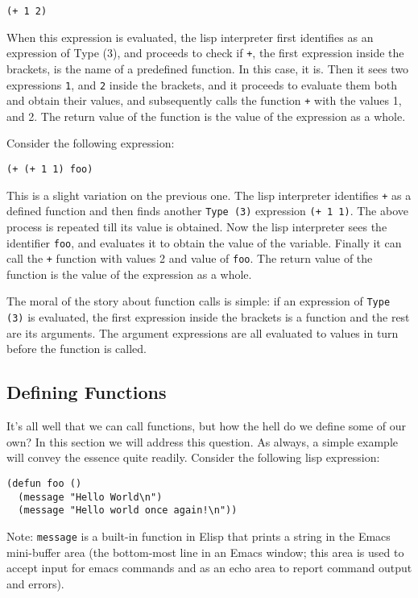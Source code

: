 \documentclass[10pt]{article}
\begin{document}
\texttt{(+ 1 2)}

When this expression is evaluated, the lisp interpreter first identifies as an
expression of Type (3), and proceeds to check if \texttt{+}, the first
expression inside the brackets, is the name of a predefined function.  In this
case, it is.  Then it sees two expressions \texttt{1}, and \texttt{2} inside
the brackets, and it proceeds to evaluate them both and obtain their values,
and subsequently calls the function \texttt{+} with the values 1, and 2.  The
return value of the function is the value of the expression as a whole.

Consider the following expression:

\texttt{(+ (+ 1 1) foo)}

This is a slight variation on the previous one.  The lisp interpreter
identifies \texttt{+} as a defined function and then finds another \texttt{Type
  (3)} expression \texttt{(+ 1 1)}.  The above process is repeated till its
value is obtained.  Now the lisp interpreter sees the identifier \texttt{foo},
and evaluates it to obtain the value of the variable.  Finally it can call the
\texttt{+} function with values 2 and value of \texttt{foo}.  The return value
of the function is the value of the expression as a whole.

The moral of the story about function calls is simple: if an expression of
\texttt{Type (3)} is evaluated, the first expression inside the brackets is a
function and the rest are its arguments.  The argument expressions are all
evaluated to values in turn before the function is called.

\subsection{Defining Functions}

It's all well that we can call functions, but how the hell do we define some of
our own?  In this section we will address this question.  As always, a simple
example will convey the essence quite readily.  Consider the following lisp
expression:

\begin{verbatim}
(defun foo ()
  (message "Hello World\n")
  (message "Hello world once again!\n"))
\end{verbatim}

Note: \texttt{message} is a built-in function in Elisp that prints a string in
the Emacs mini-buffer area (the bottom-most line in an Emacs window; this area
is used to accept input for emacs commands and as an echo area to report
command output and errors).
\end{document}
